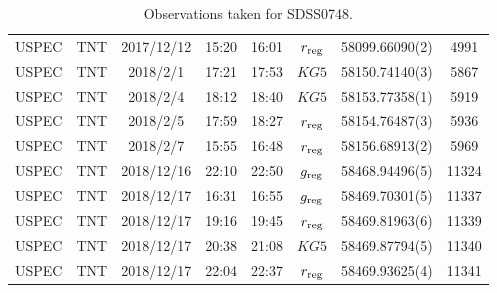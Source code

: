 \begin{table}
\begin{center}
\begin{tabular}{cccccccc}
			USPEC & TNT     & 2017/12/12 & 15:20 & 16:01 & $r_{\rm reg}$                         & 58099.66090(2)                                                                                                            &                                        4991 \\
			USPEC & TNT     & 2018/2/1   & 17:21 & 17:53 & $KG5$                                 & 58150.74140(3)                                                                                                            &                                        5867 \\
			USPEC & TNT     & 2018/2/4   & 18:12 & 18:40 & $KG5$                                 & 58153.77358(1)                                                                                                            &                                        5919 \\
			USPEC & TNT     & 2018/2/5   & 17:59 & 18:27 & $r_{\rm reg}$                         & 58154.76487(3)                                                                                                            &                                        5936 \\
			USPEC & TNT     & 2018/2/7   & 15:55 & 16:48 & $r_{\rm reg}$                         & 58156.68913(2)                                                                                                            &                                        5969 \\
			USPEC & TNT     & 2018/12/16 & 22:10 & 22:50 & $g_{\rm reg}$                         & 58468.94496(5)                                                                                                            &                                       11324 \\
			USPEC & TNT     & 2018/12/17 & 16:31 & 16:55 & $g_{\rm reg}$                         & 58469.70301(5)                                                                                                            &                                       11337 \\
			USPEC & TNT     & 2018/12/17 & 19:16 & 19:45 & $r_{\rm reg}$                         & 58469.81963(6)                                                                                                            &                                       11339 \\
			USPEC & TNT     & 2018/12/17 & 20:38 & 21:08 & $KG5$                                 & 58469.87794(5)                                                                                                            &                                       11340 \\
			USPEC & TNT     & 2018/12/17 & 22:04 & 22:37 & $r_{\rm reg}$                         & 58469.93625(4)                                                                                                            &                                       11341 \\
		   \hline
		\end{tabular}
	\end{center}
	\caption{Observations taken for SDSS0748.}
	\label{table:observing:observation logs SDSS0748}
\end{table}